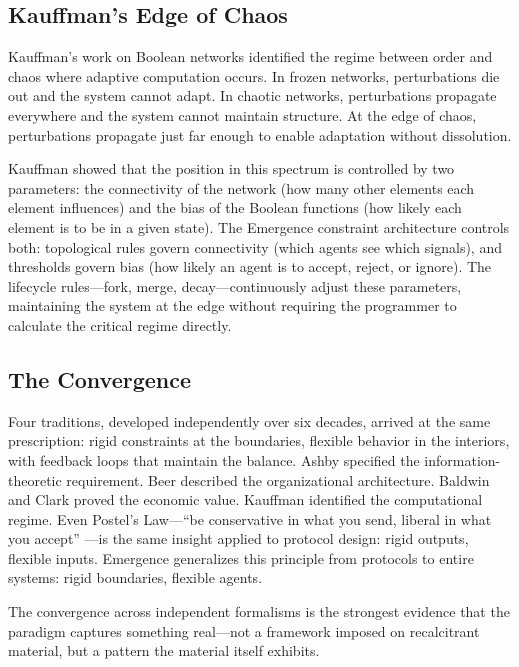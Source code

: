 \documentclass[11pt,twocolumn]{article}
\begin{document}
\subsection{Kauffman's Edge of Chaos}

Kauffman's work on Boolean networks \citep{kauffman1993origins}
identified the regime between order and chaos where adaptive
computation occurs.  In frozen networks, perturbations die out and the
system cannot adapt.  In chaotic networks, perturbations propagate
everywhere and the system cannot maintain structure.  At the edge of
chaos, perturbations propagate just far enough to enable adaptation
without dissolution.

Kauffman showed that the position in this spectrum is controlled by two
parameters: the connectivity of the network (how many other elements
each element influences) and the bias of the Boolean functions (how
likely each element is to be in a given state).  The Emergence
constraint architecture controls both: topological rules govern
connectivity (which agents see which signals), and thresholds govern
bias (how likely an agent is to accept, reject, or ignore).  The
lifecycle rules---fork, merge, decay---continuously adjust these
parameters, maintaining the system at the edge without requiring the
programmer to calculate the critical regime directly.

\subsection{The Convergence}

Four traditions, developed independently over six decades, arrived at
the same prescription: rigid constraints at the boundaries, flexible
behavior in the interiors, with feedback loops that maintain the
balance.  Ashby specified the information-theoretic requirement.  Beer
described the organizational architecture.  Baldwin and Clark proved the
economic value.  Kauffman identified the computational regime.  Even
Postel's Law---``be conservative in what you send, liberal in what you
accept'' \citep{postel1980dod}---is the same insight applied to protocol
design: rigid outputs, flexible inputs.  Emergence generalizes this
principle from protocols to entire systems: rigid boundaries, flexible
agents.

The convergence across independent formalisms is the strongest evidence
that the paradigm captures something real---not a framework imposed on
recalcitrant material, but a pattern the material itself exhibits.
\end{document}
